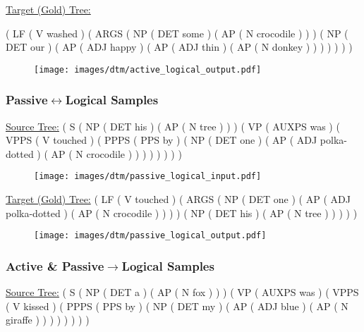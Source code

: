 \underline{Target (Gold) Tree:}

\hspace{.15in} ( LF ( V washed ) ( ARGS ( NP ( DET some ) ( AP ( N crocodile ) ) ) ( NP ( DET our ) ( AP ( ADJ happy ) ( AP ( ADJ thin ) ( AP ( N donkey ) ) ) ) ) ) )	

\begin{figure}[H]
\vskip 0.2in
\begin{center}
\centerline{\texttt{[image: images/dtm/active\_logical\_output.pdf]}}
\end{center}
\vskip -0.2in
\end{figure}

\subsubsection{\textbf{Passive$\leftrightarrow$Logical} Samples}

\underline{Source Tree:}
\hspace{.15in} ( S ( NP ( DET his ) ( AP ( N tree ) ) ) ( VP ( AUXPS was ) ( VPPS ( V touched ) ( PPPS ( PPS by ) ( NP ( DET one ) ( AP ( ADJ polka-dotted ) ( AP ( N crocodile ) ) ) ) ) ) ) )	

\begin{figure}[H]
\vskip 0.2in
\begin{center}
\centerline{\texttt{[image: images/dtm/passive\_logical\_input.pdf]}}
\end{center}
\vskip -0.2in
\end{figure}

\underline{Target (Gold) Tree:}
\hspace{.15in} ( LF ( V touched ) ( ARGS ( NP ( DET one ) ( AP ( ADJ polka-dotted ) ( AP ( N crocodile ) ) ) ) ( NP ( DET his ) ( AP ( N tree ) ) ) ) )

\begin{figure}[H]
\vskip 0.2in
\begin{center}
\centerline{\texttt{[image: images/dtm/passive\_logical\_output.pdf]}}
\end{center}
\vskip -0.2in
\end{figure}

\subsubsection{\textbf{Active \& Passive$\rightarrow$Logical} Samples}

\underline{Source Tree:}
\hspace{.15in} ( S ( NP ( DET a ) ( AP ( N fox ) ) ) ( VP ( AUXPS was ) ( VPPS ( V kissed ) ( PPPS ( PPS by ) ( NP ( DET my ) ( AP ( ADJ blue ) ( AP ( N giraffe ) ) ) ) ) ) ) )

